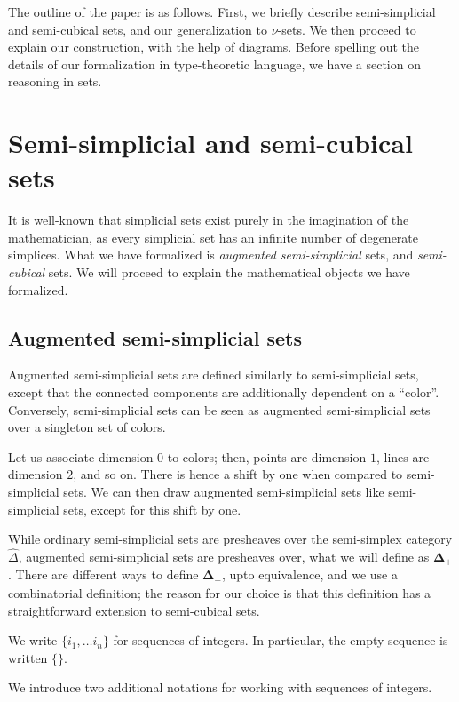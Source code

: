 \documentclass[10pt]{art.cls/art}
\newcommand{\DeltaPlus}{\ensuremath{\boldsymbol{\Delta}_+}}
\begin{document}
The outline of the paper is as follows. First, we briefly describe semi-simplicial and semi-cubical sets, and our generalization to $\nu$-sets. We then proceed to explain our construction, with the help of diagrams. Before spelling out the details of our formalization in type-theoretic language, we have a section on reasoning in sets.

\section{Semi-simplicial and semi-cubical sets}
It is well-known that simplicial sets exist purely in the imagination of the mathematician, as every simplicial set has an infinite number of degenerate simplices. What we have formalized is \emph{augmented semi-simplicial} sets, and \emph{semi-cubical} sets. We will proceed to explain the mathematical objects we have formalized.

\subsection{Augmented semi-simplicial sets}
Augmented semi-simplicial sets are defined similarly to semi-simplicial sets, except that the connected components are additionally dependent on a ``color''. Conversely, semi-simplicial sets can be seen as augmented semi-simplicial sets over a singleton set of colors.

Let us associate dimension $0$ to colors; then, points are dimension $1$, lines are dimension $2$, and so on. There is hence a shift by one when compared to semi-simplicial sets. We can then draw augmented semi-simplicial sets like semi-simplicial sets, except for this shift by one.

While ordinary semi-simplicial sets are presheaves over the semi-simplex category $\hat{\Delta}$, augmented semi-simplicial sets are presheaves over, what we will define as $\DeltaPlus$. There are different ways to define $\DeltaPlus$, upto equivalence, and we use a combinatorial definition; the reason for our choice is that this definition has a straightforward extension to semi-cubical sets.

\begin{notation}
  We write $\{i_1, \ldots i_n\}$ for sequences of integers. In particular, the empty sequence is written $\{\}$.
\end{notation}

We introduce two additional notations for working with sequences of integers.
\end{document}
